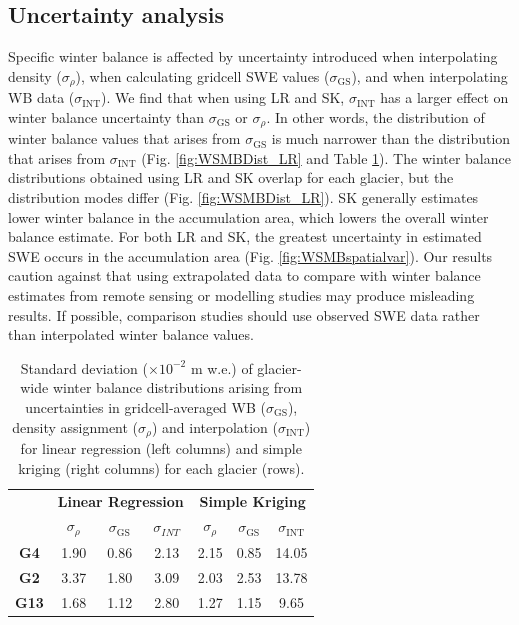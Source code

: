 \documentclass[twocolumn, letterpaper]{igs}
\begin{document}
\subsection{Uncertainty analysis}

Specific winter balance is affected by uncertainty introduced when interpolating density ($\sigma_{\rho}$), when calculating gridcell SWE values ($\sigma_{\mathrm{GS}}$), and when interpolating WB data ($\sigma_{\mathrm{INT}}$). We find that when using LR and SK, $\sigma_{\mathrm{INT}}$ has a larger effect on winter balance uncertainty than $\sigma_{\mathrm{GS}}$ or $\sigma_{\rho}$. In other words, the distribution of winter balance values that arises from $\sigma_{\mathrm{GS}}$ is much narrower than the distribution that arises from $\sigma_{\mathrm{INT}}$ (Fig. \ref{fig:WSMBDist_LR} and Table \ref{tab:WSMBdistribution_sigma}). The winter balance distributions obtained using LR and SK overlap for each glacier, but the distribution modes differ (Fig. \ref{fig:WSMBDist_LR}). SK generally estimates lower winter balance in the accumulation area, which lowers the overall winter balance estimate. For both LR and SK, the greatest uncertainty in estimated SWE occurs in the accumulation area (Fig. \ref{fig:WSMBspatialvar}). Our results caution against that using extrapolated data to compare with winter balance estimates from remote sensing or modelling studies may produce misleading results. If possible, comparison studies should use observed SWE data rather than interpolated winter balance values. 


 \begin{table}[]
\centering
\caption{Standard deviation ($\times10^{-2}$ m w.e.) of glacier-wide winter balance distributions arising from uncertainties in gridcell-averaged WB ($\sigma_{\mathrm{GS}}$), density assignment ($\sigma_{\rho}$) and interpolation ($\sigma_{\mathrm{INT}}$) for linear regression (left columns) and simple kriging (right columns) for each glacier (rows).}
\label{tab:WSMBdistribution_sigma}
\begin{tabular}{c|ccc|ccc}
\textbf{} & \multicolumn{3}{c|}{\textbf{Linear Regression}} & \multicolumn{3}{c}{\textbf{Simple Kriging}} \\
 & $\sigma_{\rho}$ & $\sigma_{\mathrm{GS}}$ & $\sigma_{INT}$ & $\sigma_{\rho}$ & $\sigma_{\mathrm{GS}}$ & $\sigma_{\mathrm{INT}}$ \\
\hline
\textbf{G4} & 1.90 & 0.86 & 2.13 & 2.15 & 0.85 & 14.05 \\
\textbf{G2} &3.37 & 1.80 & 3.09 & 2.03 & 2.53 & 13.78 \\
\textbf{G13} & 1.68 & 1.12 & 2.80 & 1.27 & 1.15 & 9.65
\end{tabular}
\end{table}
\end{document}
